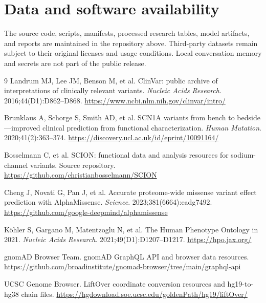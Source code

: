 \documentclass[12pt,a4paper]{article}
\begin{document}
\section*{Data and software availability}
The source code, scripts, manifests, processed research tables, model artifacts, and reports are maintained in the repository above. Third-party datasets remain subject to their original licenses and usage conditions. Local conversation memory and secrets are not part of the public release.

\begin{thebibliography}{9}
Landrum MJ, Lee JM, Benson M, et al.
ClinVar: public archive of interpretations of clinically relevant variants.
\emph{Nucleic Acids Research}. 2016;44(D1):D862--D868.
\url{https://www.ncbi.nlm.nih.gov/clinvar/intro/}

Brunklaus A, Schorge S, Smith AD, et al.
SCN1A variants from bench to bedside---improved clinical prediction from functional characterization.
\emph{Human Mutation}. 2020;41(2):363--374.
\url{https://discovery.ucl.ac.uk/id/eprint/10091164/}

Bosselmann C, et al.
SCION: functional data and analysis resources for sodium-channel variants.
Source repository.
\url{https://github.com/christianbosselmann/SCION}

Cheng J, Novati G, Pan J, et al.
Accurate proteome-wide missense variant effect prediction with AlphaMissense.
\emph{Science}. 2023;381(6664):eadg7492.
\url{https://github.com/google-deepmind/alphamissense}

Köhler S, Gargano M, Matentzoglu N, et al.
The Human Phenotype Ontology in 2021.
\emph{Nucleic Acids Research}. 2021;49(D1):D1207--D1217.
\url{https://hpo.jax.org/}

gnomAD Browser Team.
gnomAD GraphQL API and browser data resources.
\url{https://github.com/broadinstitute/gnomad-browser/tree/main/graphql-api}

UCSC Genome Browser.
LiftOver coordinate conversion resources and hg19-to-hg38 chain files.
\url{https://hgdownload.soe.ucsc.edu/goldenPath/hg19/liftOver/}
\end{thebibliography}
\end{document}
